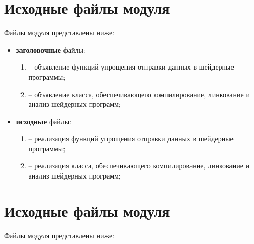 \section{Исходные файлы модуля }

Файлы модуля представлены ниже:

\begin{itemize}[label=---]
    \item \textbf{заголовочные} файлы:
    \begin{enumerate}[label=\arabic*), labelsep=0.5em]
        \item {} -- объявление функций упрощения отправки данных в шейдерные программы;
        \item {} -- объявление класса, обеспечивающего компилирование, линкование и
        анализ шейдерных программ;
    \end{enumerate}
    \item \textbf{исходные} файлы:
    \begin{enumerate}[label=\arabic*), labelsep=0.5em]
        \item {} -- реализация функций упрощения отправки данных в шейдерные программы;
        \item {} -- реализация класса, обеспечивающего компилирование, линкование и
        анализ шейдерных программ;
    \end{enumerate}
\end{itemize}

\section{Исходные файлы модуля }

Файлы модуля представлены ниже:

